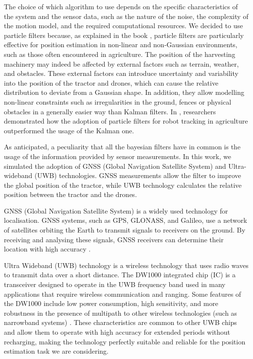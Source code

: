 \documentclass[letterpaper,twocolumn,10pt]{article}
\begin{document}
The choice of which algorithm to use depends on the specific characteristics of the system and the sensor data, such as the nature of the noise, the complexity of the motion model, and the required computational resources. We decided to use particle filters because, as explained in the book \cite{thrun2005probabilistic}, particle filters are particularly effective for position estimation in non-linear and non-Gaussian environments, such as those often encountered in agriculture. The position of the harvesting machinery may indeed be affected by external factors such as terrain, weather, and obstacles. These external factors can introduce uncertainty and variability into the position of the tractor and drones, which can cause the relative distribution to deviate from a Gaussian shape. In addition, they allow modelling non-linear constraints such as irregularities in the ground, fences or physical obstacles in a generally easier way than Kalman filters. In \cite{BLOK2019261}, researchers demonstrated how the adoption of particle filters for robot tracking in agriculture outperformed the usage of the Kalman one.

As anticipated, a peculiarity that all the bayesian filters have in common is the usage of the information provided by sensor measurements. In this work, we simulated the adoption of GNSS (Global Navigation Satellite System) and Ultra-wideband (UWB) technologies. GNSS measurements allow the filter to improve the global position of the tractor, while UWB technology calculates the relative position between the tractor and the drones.

GNSS (Global Navigation Satellite System) is a widely used technology for localisation. GNSS systems, such as GPS, GLONASS, and Galileo, use a network of satellites orbiting the Earth to transmit signals to receivers on the ground. By receiving and analysing these signals, GNSS receivers can determine their location with high accuracy \cite{Guo2018}. 

Ultra Wideband (UWB) technology is a wireless technology that uses radio waves to transmit data over a short distance. The DW1000 integrated chip (IC) is a transceiver designed to operate in the UWB frequency band used in many applications that require wireless communication and ranging. 
Some features of the DW1000 include low power consumption, high sensitivity, and more robustness in the presence of multipath to other wireless technologies (such as narrowband systems) \cite{8250079}. These characteristics are common to other UWB chips and allow them to operate with high accuracy for extended periods without recharging, making the technology perfectly suitable and reliable for the position estimation task we are considering.
\end{document}
